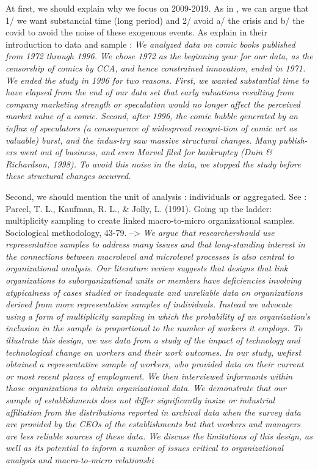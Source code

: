 \begin{itemize}
\begin{itemize}
At first, we should explain why we focus on 2009-2019. As in \citet{taylor2006superman}, we can argue that 1/ we want substancial time (long period) and 2/ avoid a/ the crisis and b/ the covid to avoid the noise of these exogenous events. As explain in their introduction to data and sample : \textit{We analyzed data on comic books published from 1972 through 1996. We chose 1972 as the beginning year for our data, as the censorship of comics by CCA, and hence constrained innovation, ended in 1971. We ended the study in 1996 for two reasons. First, we wanted substantial time to have elapsed from the end of our data set that early valuations resulting from company marketing strength or speculation would no longer affect the perceived market value of a comic. Second, after 1996, the comic bubble generated by an influx of speculators (a consequence of widespread recogni-tion of comic art as valuable) burst, and the indus-try saw massive structural changes. Many publish-ers went out of business, and even Marvel filed for bankruptcy (Duin & Richardson, 1998). To avoid this noise in the data, we stopped the study before these structural changes occurred.}

Second, we should mention the unit of analysis : individuals or aggregated. See : Parcel, T. L., Kaufman, R. L., & Jolly, L. (1991). Going up the ladder: multiplicity sampling to create linked macro-to-micro organizational samples. Sociological methodology, 43-79. --> \textit{We argue that researchershould use representative samples to address many issues and that long-standing interest in the connections between macrolevel and microlevel processes is also central to organizational analysis. Our literature review suggests that designs that link organizations to suborganizational units or members have deficiencies involving atypicalness of cases studied or inadequate and unreliable data on organizations derived from more representative samples of individuals. Instead we advocate using a form of multiplicity sampling in which the probability of an organization's inclusion in the sample is proportional to the number of workers it employs. To illustrate this design, we use data from a study of the impact of technology and technological change on workers and their work outcomes. In our study, wefirst obtained a representative sample of workers, who provided data on their current or most recent places of employment. We then interviewed informants within those organizations to obtain organizational data. We demonstrate that our sample of establishments does not differ significantly insize or industrial affiliation from the distributions reported in archival data when the survey data are provided by the CEOs of the establishments but that workers and managers are less reliable sources of these data. We discuss the limitations of this design, as well as its potential to inform a number of issues critical to organizational analysis and macro-to-micro relationshi}


\end{itemize}
\end{itemize}
